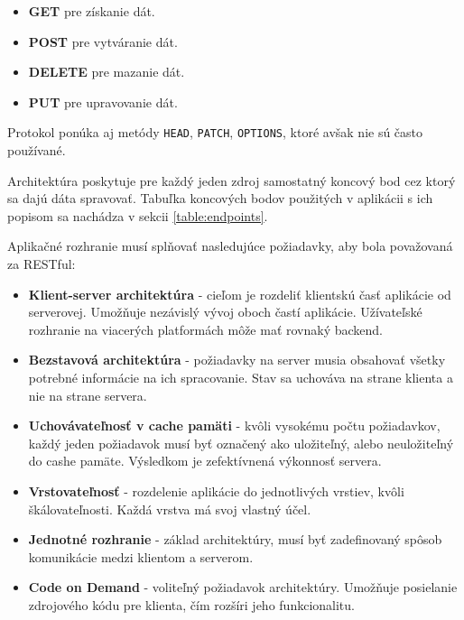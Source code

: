     \begin{itemize}
        \item\textbf{GET} pre získanie dát.
        \item\textbf{POST} pre vytváranie dát.
        \item\textbf{DELETE} pre mazanie dát.
        \item\textbf{PUT} pre upravovanie dát.
    \end{itemize}
    
Protokol ponúka aj metódy \texttt{HEAD}, \texttt{PATCH}, \texttt{OPTIONS}, ktoré avšak nie sú často používané.

\vspace{\baselineskip}

Architektúra poskytuje pre každý jeden zdroj samostatný koncový bod cez ktorý sa dajú dáta spravovať. Tabuľka koncových bodov použitých v aplikácii s ich popisom sa nachádza v sekcii \ref{table:endpoints}.

Aplikačné rozhranie musí splňovať nasledujúce požiadavky, aby bola považovaná za RESTful:

    \begin{itemize}
        \item\textbf{Klient-server architektúra} - cieľom je rozdeliť klientskú časť aplikácie od serverovej. Umožňuje nezávislý vývoj oboch častí aplikácie. Užívateľské rozhranie na viacerých platformách môže mať rovnaký backend.
        \item\textbf{Bezstavová architektúra} - požiadavky na server musia obsahovať všetky potrebné informácie na ich spracovanie. Stav sa uchováva na strane klienta a nie na strane servera.
        \item\textbf{Uchovávateľnosť v cache pamäti} - kvôli vysokému počtu požiadavkov, každý jeden požiadavok musí byť označený ako uložiteľný, alebo neuložiteľný do cashe pamäte. Výsledkom je zefektívnená výkonnosť servera.
        \item\textbf{Vrstovateľnosť} - rozdelenie aplikácie do jednotlivých vrstiev, kvôli škálovateľnosti. Každá vrstva má svoj vlastný účel.
        \item\textbf{Jednotné rozhranie} - základ architektúry, musí byť zadefinovaný spôsob komunikácie medzi klientom a serverom.
        \item\textbf{Code on Demand} - voliteľný požiadavok architektúry. Umožňuje posielanie zdrojového kódu pre klienta, čím rozšíri jeho funkcionalitu.
    \end{itemize}

